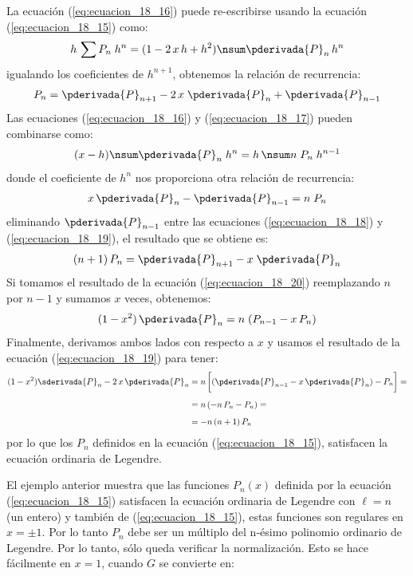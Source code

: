 La ecuación (\ref{eq:ecuacion_18_16}) puede re-escribirse usando la ecuación (\ref{eq:ecuacion_18_15}) como:
\begin{align*}
h \, \sum P_{n} \; h^{n} =  (1 - 2 \, x \, h + h^{2}) \nsum \pderivada{P}_{n} \, h^{n}
\end{align*}
igualando los coeficientes de $h^{n+1}$, obtenemos la relación de recurrencia:
\begin{align}
P_{n} = \pderivada{P}_{n+1} - 2 \, x \; \pderivada{P}_{n} + \pderivada{P}_{n-1}
\label{eq:ecuacion_18_18}
\end{align}
Las ecuaciones (\ref{eq:ecuacion_18_16}) y (\ref{eq:ecuacion_18_17}) pueden combinarse como:
\begin{align*}
(x - h) \nsum \pderivada{P}_{n} \; h^{n} = h \, \nsum n \; P_{n} \; h^{n-1}
\end{align*}
donde el coeficiente de $h^{n}$ nos proporciona otra relación de recurrencia:
\begin{align}
x \, \pderivada{P}_{n} - \pderivada{P}_{n-1} =  n \; P_{n}
\label{eq:ecuacion_18_19}
\end{align}
eliminando $\pderivada{P}_{n-1}$ entre las ecuaciones (\ref{eq:ecuacion_18_18}) y (\ref{eq:ecuacion_18_19}), el resultado que se obtiene es:
\begin{align}
(n + 1) \, P_{n} = \pderivada{P}_{n+1} - x \; \pderivada{P}_{n}
\label{eq:ecuacion_18_20}
\end{align}
Si tomamos el resultado de la ecuación (\ref{eq:ecuacion_18_20}) reemplazando $n$ por $n-1$ y sumamos $x$ veces, obtenemos:
\begin{equation}
(1 - x^{2}) \, \pderivada{P}_{n} = n \; (P_{n-1} - x \, P_{n})
\label{eq:ecuacion_18_21}
\end{equation}
Finalmente, derivamos ambos lados con respecto a $x$ y usamos el resultado de la ecuación (\ref{eq:ecuacion_18_19}) para tener:
\begin{align*}
(1 - x^{2}) \sderivada{P}_{n} - 2 \, x \, \pderivada{P}_{n} &= n \, \bigg[ (\pderivada{P}_{n-1} - x \, \pderivada{P}_{n}) - P_{n} \bigg] = \\[0.5em]
&= n \, (-n \, P_{n} - P_{n}) = \\[0.5em]
&= -n \, (n + 1) \, P_{n}
\end{align*}
por lo que los $P_{n}$ definidos en la ecuación (\ref{eq:ecuacion_18_15}), satisfacen la ecuación ordinaria de Legendre.
\par
El ejemplo anterior muestra que las funciones $P_{n} (x)$ definida por la ecuación (\ref{eq:ecuacion_18_15}) satisfacen la ecuación ordinaria de Legendre con $\ell = n$ (un entero) y también de (\ref{eq:ecuacion_18_15}), estas funciones son regulares en $x = \pm 1$. Por lo tanto $P_{n}$ debe ser un múltiplo del n-ésimo polinomio ordinario de Legendre. Por lo tanto, sólo queda verificar la normalización. Esto se hace fácilmente en $x = 1$, cuando $G$ se convierte en:
